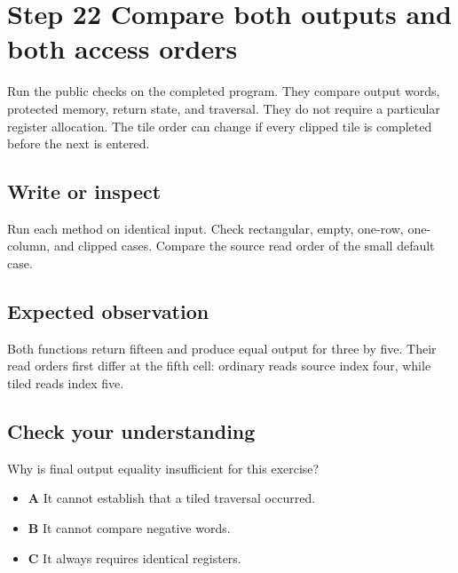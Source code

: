 \section{Step 22 Compare both outputs and both access orders}\label{transpose-s22}

Run the public checks on the completed program. They compare output words, protected memory, return state, and traversal. They do not require a particular register allocation. The tile order can change if every clipped tile is completed before the next is entered.

\subsection{Write or inspect}
Run each method on identical input. Check rectangular, empty, one-row, one-column, and clipped cases. Compare the source read order of the small default case.

\subsection{Expected observation}
Both functions return fifteen and produce equal output for three by five. Their read orders first differ at the fifth cell: ordinary reads source index four, while tiled reads index five.

\subsection{Check your understanding}
Why is final output equality insufficient for this exercise?

\begin{itemize}
  \item \textbf{A} It cannot establish that a tiled traversal occurred.
  \item \textbf{B} It cannot compare negative words.
  \item \textbf{C} It always requires identical registers.
\end{itemize}
